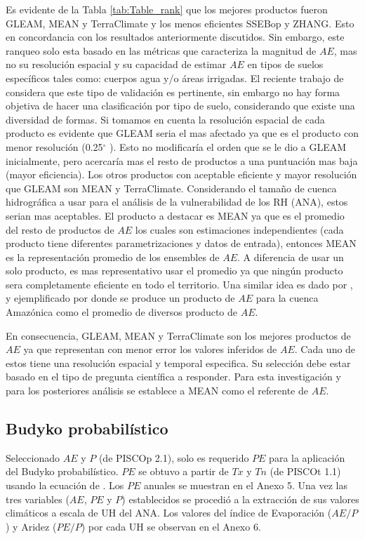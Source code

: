 \documentclass[12pt]{article}
\begin{document}
Es evidente de la Tabla \ref{tab:Table_rank} que los mejores productos fueron GLEAM, MEAN y TerraClimate y los menos eficientes SSEBop y ZHANG. Esto en concordancia con los resultados anteriormente discutidos. Sin embargo, este ranqueo solo esta basado en las métricas que caracteriza la magnitud de $AE$, mas no su resolución espacial y su capacidad de estimar $AE$ en tipos de suelos específicos tales como: cuerpos agua y/o áreas irrigadas. El reciente trabajo de \citet{Weerasinghe2019discuss} considera que este tipo de validación es pertinente, sin embargo no hay forma objetiva de hacer una clasificación por tipo de suelo, considerando que existe una diversidad de formas. Si tomamos en cuenta la resolución espacial de cada producto es evidente que GLEAM seria el mas afectado ya que es el producto con menor resolución (0.25$^{\circ}$ ). Esto no modificaría el orden que se le dio a GLEAM inicialmente, pero acercaría mas el resto de productos a una puntuación mas baja (mayor eficiencia). Los otros productos con aceptable eficiente y mayor resolución que GLEAM son MEAN y TerraClimate. Considerando el tamaño de cuenca hidrográfica a usar para el análisis de la vulnerabilidad de los RH (ANA), estos serian mas aceptables. El producto a destacar es MEAN ya que es el promedio del resto de productos de $AE$ los cuales son estimaciones independientes (cada producto tiene diferentes parametrizaciones y datos de entrada), entonces MEAN es la representación promedio de los ensembles de $AE$. A diferencia de usar un solo producto, es mas representativo usar el promedio ya que ningún producto sera completamente eficiente en todo el territorio. Una similar idea es dado por \citet{zhang2016review}, y ejemplificado por \citet{da2019spatial} donde se produce un producto de $AE$ para la cuenca Amazónica como el promedio de diversos producto de $AE$.

En consecuencia, GLEAM, MEAN y TerraClimate son los mejores productos de $AE$ ya que representan con menor error los valores inferidos de $AE$. Cada uno de estos tiene una resolución espacial y temporal especifica. Su selección debe estar basado en el tipo de pregunta científica a responder. Para esta investigación y para los posteriores análisis se establece a MEAN como el referente de $AE$.

\subsection{Budyko probabilístico}

Seleccionado $AE$ y $P$ (de PISCOp 2.1), solo es requerido $PE$ para la aplicación del Budyko probabilístico. $PE$ se obtuvo a partir de $Tx$ y $Tn$ (de PISCOt 1.1) usando la ecuación de \citet{Hargreaves1985}. Los $PE$ anuales se muestran en el Anexo 5. Una vez las tres variables ($AE$, $PE$ y $P$) establecidos se procedió a la extracción de sus valores climáticos a escala de UH del ANA. Los valores del índice de Evaporación ($AE/P$) y Aridez ($PE/P$) por cada UH se observan en el Anexo 6. 
\end{document}
